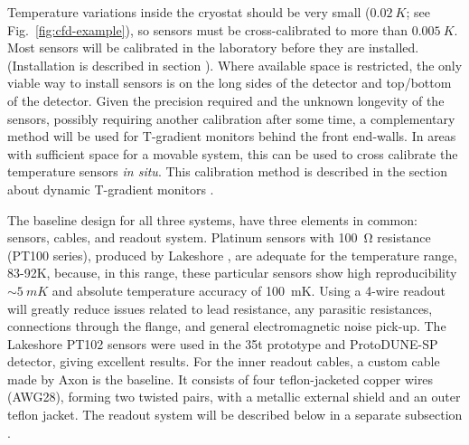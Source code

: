 
Temperature variations inside the cryostat should be very small ($\SI{0.02}{K}$; see Fig.~\ref{fig:cfd-example}), %
so sensors must be cross-calibrated to more than $\SI{0.005}{K}$. Most sensors will be calibrated in the laboratory before they are installed.
(Installation is described in section ). Where available space is restricted, the only viable way to install sensors is on the long sides of the detector
and top/bottom of the detector. 
Given the precision required and the unknown longevity of the sensors, possibly requiring another  calibration after some time, a complementary method
will be used for T-gradient monitors behind the front end-walls.
In areas with sufficient space for a movable system, this can be used to cross calibrate
the temperature sensors  {\em in situ}. This calibration method is described in the section about dynamic T-gradient monitors  . 

The baseline design for all three systems,  have three elements in common: sensors, cables, and readout system.
Platinum sensors with \SI{100}{\ohm} resistance (PT100 series), produced by Lakeshore  ,  
are adequate for the temperature range, 83-92\si{K}, because, in this range, these particular sensors show high reproducibility 
$\sim\SI{5}{mK}$ and absolute temperature accuracy of \SI{100}{mK}.
Using a 4-wire readout will greatly reduce issues related to lead resistance, any parasitic resistances,
connections through the flange, and general electromagnetic noise pick-up. The Lakeshore PT102 sensors
were used in the 35t prototype and ProtoDUNE-SP detector,
giving excellent results. For the inner readout cables, a custom cable made by Axon is the baseline. It consists of four teflon-jacketed 
copper wires (AWG28), forming two twisted pairs, with a metallic external shield
and an outer teflon jacket.
The readout system will be described below in a separate subsection  . 

